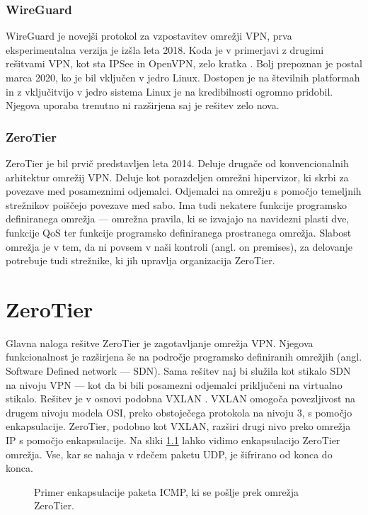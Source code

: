 \documentclass[a4paper, 12pt]{book}
\begin{document}
\subsection{WireGuard}
WireGuard je novejši protokol za vzpostavitev omrežji VPN, prva eksperimentalna verzija je izšla leta 2018. Koda je v primerjavi z drugimi rešitvami VPN, kot sta IPSec in OpenVPN, zelo kratka \cite{donenfeld_quick_nodate}. Bolj prepoznan je postal marca 2020, ko je bil vključen v jedro Linux. Dostopen je na številnih platformah in z vključitvijo v jedro sistema Linux je na kredibilnosti ogromno pridobil. Njegova uporaba trenutno ni razširjena saj je rešitev zelo nova.

\subsection{ZeroTier}
ZeroTier je bil prvič predstavljen leta 2014. Deluje drugače od konvencionalnih arhitektur omrežij VPN. Deluje kot porazdeljen omrežni hipervizor, ki skrbi za povezave med posameznimi odjemalci. Odjemalci na omrežju s pomočjo temeljnih strežnikov poiščejo povezave med sabo. Ima tudi nekatere funkcije programsko definiranega omrežja --- omrežna pravila, ki se izvajajo na navidezni plasti dve, funkcije QoS ter funkcije programsko definiranega prostranega omrežja. Slabost omrežja je v tem, da ni povsem v naši kontroli (angl. on premises), za delovanje potrebuje tudi strežnike, ki jih upravlja organizacija ZeroTier.


\chapter{ZeroTier}
\label{ZeroTier}
Glavna naloga rešitve ZeroTier je zagotavljanje omrežja VPN. Njegova funkcionalnost je razširjena še na področje programsko definiranih omrežjih (angl. Software Defined network --- SDN). Sama rešitev naj bi služila kot stikalo SDN na nivoju VPN --- kot da bi bili posamezni odjemalci priključeni na virtualno stikalo. Rešitev je v osnovi podobna VXLAN \cite{noauthor_what_nodate}. VXLAN omogoča povezljivost na drugem nivoju modela OSI, preko obstoječega protokola na nivoju 3, s pomočjo enkapsulacije. ZeroTier, podobno kot VXLAN, razširi drugi nivo preko omrežja IP s pomočjo enkapsulacije. Na sliki \ref{enkapsulacija} lahko vidimo enkapsulacijo ZeroTier omrežja. Vse, kar se nahaja v rdečem paketu UDP, je šifrirano od konca do konca.

\begin{figure}[h]
\begin{center}

\end{center}
\caption{Primer enkapsulacije paketa ICMP, ki se pošlje prek omrežja ZeroTier. \cite{rvidmar}}
\label{enkapsulacija}
\end{figure}
\end{document}
